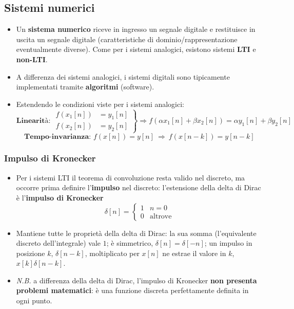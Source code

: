 \documentclass[12pt, a4paper]{article}
\begin{document}
\subsection{Sistemi numerici}
\begin{itemize}
    \item Un \textbf{sistema numerico} riceve in ingresso un segnale digitale e restituisce in uscita un segnale digitale (caratteristiche di dominio/rappresentazione eventualmente diverse). Come per i sistemi analogici, esistono sistemi \textbf{LTI} e \textbf{non-LTI}.
    \item A differenza dei sistemi analogici, i sistemi digitali sono tipicamente implementati tramite \textbf{algoritmi} (software).
    \item Estendendo le condizioni viste per i sistemi analogici:
    $$\textbf{Linearità: } \left.\begin{aligned}f(x_1[n])&=y_1[n]\\f(x_2[n])&=y_2[n]\end{aligned}\right\}\Rightarrow f(\alpha x_1[n]+\beta x_2[n])=\alpha y_1[n]+\beta y_2[n]$$
    $$\textbf{Tempo-invarianza: } f(x[n])=y[n] \ \Rightarrow\ f(x[n-k])=y[n-k]$$
\end{itemize}

\subsubsection{Impulso di Kronecker}
\begin{itemize}
    \item Per i sistemi LTI il teorema di convoluzione resta valido nel discreto, ma occorre prima definire l'\textbf{impulso} nel discreto: l'estensione della delta di Dirac è l'\textbf{impulso di Kronecker}
    $$\delta[n] = \begin{cases}1 & n=0 \\ 0 & \text{altrove}\end{cases}$$
    \item Mantiene tutte le proprietà della delta di Dirac: la sua somma (l'equivalente discreto dell'integrale) vale $1$; è simmetrico, $\delta[n]=\delta[-n]$; un impulso in posizione $k$, $\delta[n-k]$, moltiplicato per $x[n]$ ne estrae il valore in $k$, $x[k]\delta[n-k]$.
    \item[] \textit{N.B.} a differenza della delta di Dirac, l'impulso di Kronecker \textbf{non presenta problemi matematici}: è una funzione discreta perfettamente definita in ogni punto.
\end{itemize}
\end{document}
